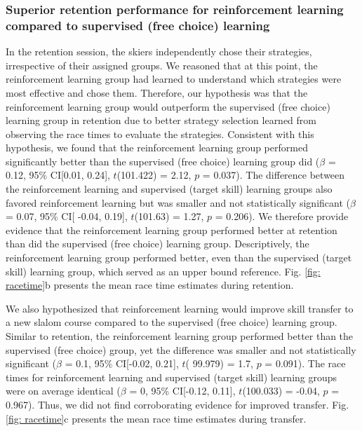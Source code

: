 \subsubsection{Superior retention performance for reinforcement learning compared to supervised (free choice) learning}\label{result_racetime_retention}
In the retention session, the skiers independently chose their strategies, irrespective of their assigned groups. We reasoned that at this point, the reinforcement learning group had learned to understand which strategies were most effective and chose them. Therefore, our hypothesis was that the reinforcement learning group would outperform the supervised (free choice) learning group in retention due to better strategy selection learned from observing the race times to evaluate the strategies. Consistent with this hypothesis, we found that the reinforcement learning group performed significantly better than the supervised (free choice) learning group did ($\beta$ = 0.12, 95\% CI[0.01, 0.24], $t$(101.422) = 2.12, $p$ = 0.037). The difference between the reinforcement learning and supervised (target skill) learning groups also favored reinforcement learning but was smaller and not statistically significant  ($\beta$ = 0.07, 95\% CI[ -0.04, 0.19], $t$(101.63) = 1.27, $p$ = 0.206). We therefore provide evidence that the reinforcement learning group performed better at retention than did the supervised (free choice) learning group. Descriptively, the reinforcement learning group performed better, even than the supervised (target skill) learning group, which served as an upper bound reference. Fig. \ref{fig: racetime}b presents the mean race time estimates during retention. 


We also hypothesized that reinforcement learning would improve skill transfer to a new slalom course compared to the supervised (free choice) learning group. Similar to retention, the reinforcement learning group performed better than the supervised (free choice) group, yet the difference was smaller and not statistically significant ($\beta$ = 0.1, 95\% CI[-0.02, 0.21], $t$( 99.979) = 1.7, $p$  = 0.091). The race times for reinforcement learning and supervised (target skill) learning groups were on average identical ($\beta$ = 0, 95\% CI[-0.12, 0.11], $t$(100.033) = -0.04, $p$ = 0.967). Thus, we did not find corroborating evidence for improved transfer. Fig. \ref{fig: racetime}c presents the mean race time estimates during transfer. 




